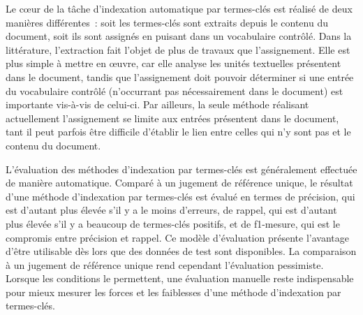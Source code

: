     Le c\oe{}ur de la tâche d'indexation automatique par termes-clés est
    réalisé de deux manières différentes~: soit les termes-clés sont extraits
    depuis le contenu du document, soit ils sont assignés en puisant dans un
    vocabulaire contrôlé. Dans la littérature, l'extraction fait l'objet de plus
    de travaux que l'assignement. Elle est plus simple à mettre en \oe{}uvre,
    car elle analyse les unités textuelles présentent dans le document, tandis
    que l'assignement doit pouvoir déterminer si une entrée du vocabulaire
    contrôlé (n'occurrant pas nécessairement dans le document) est importante
    vis-à-vis de celui-ci. Par ailleurs, la seule méthode réalisant actuellement
    l'assignement se limite aux entrées présentent dans le document, tant il
    peut parfois être difficile d'établir le lien entre celles qui n'y sont pas
    et le contenu du document.

    L'évaluation des méthodes d'indexation par termes-clés est généralement
    effectuée de manière automatique. Comparé à un jugement de référence unique,
    le résultat d'une méthode d'indexation par termes-clés est évalué en termes
    de précision, qui est d'autant plus élevée s'il y a le moins d'erreurs, de
    rappel, qui est d'autant plus élevée s'il y a beaucoup de termes-clés
    positifs, et de f1-mesure, qui est le compromis entre précision et rappel.
    Ce modèle d'évaluation présente l'avantage d'être utilisable dès lors que
    des données de test sont disponibles. La comparaison à un jugement de
    référence unique rend cependant l'évaluation pessimiste. Lorsque les
    conditions le permettent, une évaluation manuelle reste indispensable pour
    mieux mesurer les forces et les faiblesses d'une méthode d'indexation par
    termes-clés.


